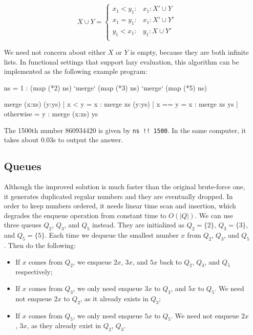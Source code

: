 \documentclass[b5paper]{article}
\begin{document}
\[
X \cup Y = \begin{cases}
  x_1 < y_1: & x_1 : X' \cup Y \\
  x_1 = y_1: & x_1 : X' \cup Y' \\
  y_1 < x_1: & y_1 : X \cup Y' \\
\end{cases}
\]

We need not concern about either $X$ or $Y$ is empty, because they are both infinite lists. In functional settings that support lazy evaluation, this algorithm can be implemented as the following example program:

\begin{Haskell}
ns = 1 : (map (*2) ns) `merge` (map (*3) ns) `merge` (map (*5) ns)

merge (x:xs) (y:ys) | x < y = x : merge xs (y:ys)
                    | x == y = x : merge xs ys
                    | otherwise = y : merge (x:xs) ys
\end{Haskell}

The 1500th number 860934420 is given by \texttt{ns !! 1500}. In the same computer, it takes about 0.03s to output the answer.

\subsection{Queues}
Although the improved solution is much faster than the original brute-force one, it generates duplicated regular numbers and they are eventually dropped. In order to keep numbers ordered, it needs linear time scan and insertion, which degrades the enqueue operation from constant time to $O(|Q|)$. We can use three queues $Q_2$, $Q_3$, and $Q_5$ instead. They are initialized as $Q_2 = \{ 2 \}$, $Q_3 = \{ 3\}$, and $Q_5 = \{ 5 \}$. Each time we dequeue the smallest number $x$ from $Q_2$, $Q_3$, and $Q_5$. Then do the following:

\begin{itemize}
\item If $x$ comes from $Q_2$, we enqueue $2x$, $3x$, and $5x$ back to $Q_2$, $Q_3$, and $Q_5$ respectively;
\item If $x$ comes from $Q_3$, we only need enqueue $3x$ to $Q_3$, and $5x$ to $Q_5$. We need not enqueue $2x$ to $Q_2$, as it already exists in $Q_3$;
\item If $x$ comes from $Q_5$, we only need enqueue $5x$ to $Q_5$. We need not enqueue $2x$, $3x$, as they already exist in $Q_2$, $Q_3$.
\end{itemize}
\end{document}
